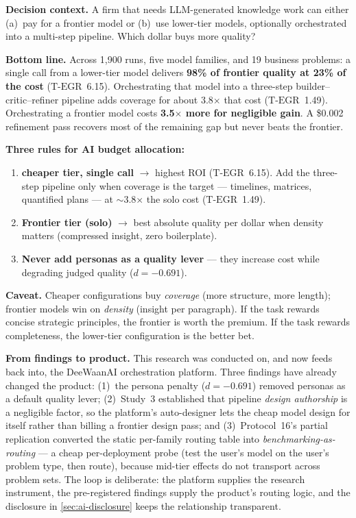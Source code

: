 \documentclass[12pt,a4paper]{article}
\newcommand{\TEGR}{\ensuremath{\text{T-EGR}}}
\begin{document}
\begin{mdframed}[style=execsummary]
\noindent\textbf{Decision context.} A firm that needs LLM-generated knowledge
work can either (a)~pay for a frontier model or (b)~use lower-tier models,
optionally orchestrated into a multi-step pipeline. Which dollar buys more
quality?

\medskip
\noindent\textbf{Bottom line.} Across 1{,}900 runs, five model families, and 19
business problems: a single call from a lower-tier model delivers
\textbf{98\% of frontier quality at 23\% of the cost} ($\TEGR$~6.15).
Orchestrating that model into a three-step builder--critic--refiner pipeline
adds coverage for about 3.8$\times$ that cost ($\TEGR$~1.49). Orchestrating a
frontier model costs \textbf{3.5$\times$ more for negligible gain}. A \$0.002
refinement pass recovers most of the remaining gap but never beats the
frontier.

\medskip
\noindent\textbf{Three rules for AI budget allocation:}
\begin{enumerate}[leftmargin=*,nosep]
  \item \textbf{cheaper tier, single call} $\to$ highest ROI
    ($\TEGR$~6.15). Add the three-step pipeline only when coverage is the
    target --- timelines, matrices, quantified plans --- at $\sim$3.8$\times$
    the solo cost ($\TEGR$~1.49).
  \item \textbf{Frontier tier (solo)} $\to$ best absolute quality per dollar
    when density matters (compressed insight, zero boilerplate).
  \item \textbf{Never add personas as a quality lever} --- they increase cost
    while degrading judged quality ($d = -0.691$).
\end{enumerate}

\medskip
\noindent\textbf{Caveat.} Cheaper configurations buy \emph{coverage} (more
structure, more length); frontier models win on \emph{density} (insight per
paragraph). If the task rewards concise strategic principles, the frontier is
worth the premium. If the task rewards completeness, the lower-tier
configuration is the better bet.
\end{mdframed}

\textbf{From findings to product.} This research was conducted on, and now
feeds back into, the DeeWaanAI orchestration platform. Three findings have
already changed the product: (1)~the persona penalty ($d = -0.691$) removed
personas as a default quality lever; (2)~Study~3 established that pipeline
\emph{design authorship} is a negligible factor, so the platform's
auto-designer lets the cheap model design for itself rather than billing a
frontier design pass; and (3)~Protocol~16's partial replication converted the
static per-family routing table into \emph{benchmarking-as-routing} --- a
cheap per-deployment probe (test the user's model on the user's problem type,
then route), because mid-tier effects do not transport across problem sets.
The loop is deliberate: the platform supplies the research instrument, the
pre-registered findings supply the product's routing logic, and the
disclosure in \cref{sec:ai-disclosure} keeps the relationship transparent.
\end{document}
